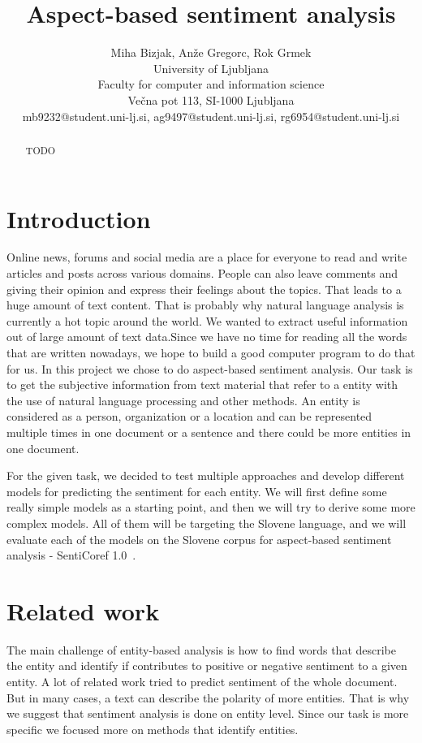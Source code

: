 \documentclass[11pt,a4paper]{article}
\title{Aspect-based sentiment analysis}
\author{
    Miha Bizjak, Anže Gregorc, Rok Grmek \\
    University of Ljubljana \\
    Faculty for computer and information science \\
    Večna pot 113, SI-1000 Ljubljana \\
    mb9232@student.uni-lj.si, ag9497@student.uni-lj.si, rg6954@student.uni-lj.si
}
\date{}
\begin{document}
\maketitle



\begin{abstract}
    TODO
\end{abstract}



\section{Introduction}

Online news, forums and social media are a place for everyone to read and write articles and posts across various domains.
People can also leave comments and giving their opinion and express their feelings about the topics.
That leads  to a huge amount of text content.
That is probably why natural language analysis is currently a hot topic around the world.
We wanted to extract useful information out of large amount of text data.Since we have no time for reading all the words that are written nowadays, we hope to build a good computer program to do that for us.
In this project we chose to do aspect-based sentiment analysis.
Our task is to get the subjective information from text material that refer to a entity with the use of natural language processing and other methods.
An entity is considered as a person, organization or a location and can be represented multiple times in one document or a sentence and there could be more entities in one document.

For the given task, we decided to test multiple approaches and develop different models for predicting the sentiment for each entity.
We will first define some really simple models as a starting point, and then we will try to derive some more complex models.
All of them will be targeting the Slovene language, and we will evaluate each of the models on the Slovene corpus for aspect-based sentiment analysis - SentiCoref 1.0~\cite{zitnik2019slovene}.



\section{Related work}

The main challenge of entity-based analysis is how to find words that describe the entity and identify if contributes to positive or negative sentiment to a given entity.
A lot of related work tried to predict sentiment of the whole document.
But in many cases, a text can describe the polarity of more entities.
That is why we suggest that sentiment analysis is done on entity level.
Since our task is more specific we focused more on methods that identify entities.
\end{document}
